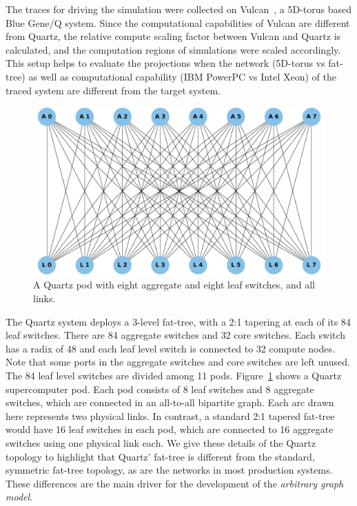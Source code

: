The traces for driving the simulation were collected on
Vulcan~\cite{vulcan}, a 5D-torus based Blue Gene/Q
system.  Since the computational capabilities of Vulcan are different from
Quartz, the relative compute scaling factor between Vulcan and
Quartz is calculated, and the computation regions of simulations were scaled accordingly. This
setup helps to evaluate the projections when the network (5D-torus vs fat-tree)
as well as computational capability (IBM PowerPC vs Intel Xeon) of the traced
system are different from the target system.
\FloatBarrier
\begin{figure}[!htbp]
  \centering
  \includegraphics[width=0.8\columnwidth]{figure/val/quartztopo.pdf}
  \caption{A Quartz pod with eight aggregate and eight leaf switches, and all links.}
  \label{fig:quartz_pod}
\end{figure}
\FloatBarrier
\vspace{0.08in}
 The Quartz system deploys a 3-level fat-tree, with a 2:1
tapering at each of its 84 leaf switches. There are 84 aggregate switches and 32
core switches. Each switch has a radix of 48 and each leaf level switch is
connected to 32 compute nodes.  Note that some ports in the aggregate switches
and core switches are left unused.  The 84 leaf level switches are divided among 
11 pods. Figure~\ref{fig:quartz_pod} shows a Quartz supercomputer pod.  Each pod consists 
of 8 leaf switches and 8 aggregate switches, which are connected in an
all-to-all bipartite graph. Each arc drawn here represents two physical links. 
In contrast, a standard 2:1 tapered fat-tree would have 16 leaf switches in 
each pod, which are connected to 16 aggregate switches using one physical link
each. We give these details of the Quartz topology to highlight that
Quartz' fat-tree is different from the standard, symmetric fat-tree topology,
as are the networks in most production systems. These differences are the main driver
for the development of the {\em arbitrary graph model}. 

